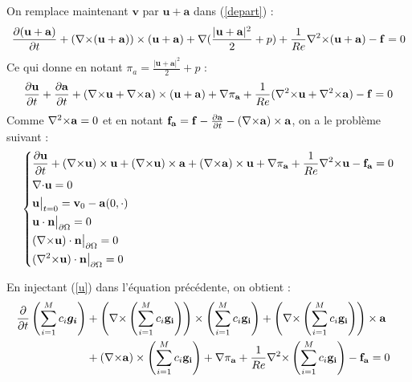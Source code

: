 On remplace maintenant $\mathbf{v}$ par $\mathbf{u}+\mathbf{a}$ dans (\ref{depart}) :
\[ \frac{\partial(\mathbf{u}+\mathbf{a})}{\partial t}+({\nabla\times}(\mathbf{u}+\mathbf{a}))\times(\mathbf{u}+\mathbf{a}) + {\nabla} (\frac{|\mathbf{u}+\mathbf{a}|^2}{2}+p) + \frac{1}{Re}{\nabla^2\times}(\mathbf{u}+\mathbf{a}) - \mathbf{f} = 0 \]
Ce qui donne en notant $\pi_a=\frac{|\mathbf{u}+\mathbf{a}|^2}{2}+p$ :
\[ \frac{\partial \mathbf{u}}{\partial t}+\frac{\partial \mathbf{a}}{\partial t} + ({\nabla\times} \mathbf{u}+{\nabla\times} \mathbf{a})\times(\mathbf{u}+\mathbf{a}) + {\nabla}\pi_{\mathbf{a}} + \frac{1}{Re}({\nabla^2\times} \mathbf{u}+{\nabla^2\times} \mathbf{a}) - \mathbf{f} = 0 \]
Comme ${\nabla^2\times} \mathbf{a} = 0$ et en notant $\mathbf{f_a}=\mathbf{f}-\frac{\partial \mathbf{a}}{\partial t} - ({\nabla\times} \mathbf{a})\times \mathbf{a}$, on a le problème suivant :
\begin{equation}\label{pbu}
\left\{\begin{aligned}
&\frac{\partial \mathbf{u}}{\partial t} + ({\nabla\times} \mathbf{u})\times \mathbf{u} + ({\nabla\times} \mathbf{u})\times \mathbf{a} +({\nabla\times} \mathbf{a})\times \mathbf{u} + {\nabla} \pi_{\mathbf{a}} +\frac{1}{Re}{\nabla^2\times}  \mathbf{u} - \mathbf{f_a} = 0\\
&{\nabla\cdot} \mathbf{u} = 0\\
&\mathbf{u}\big\rvert_{t=0} = \mathbf{v}_0 - \mathbf{a}(0,\cdot)\\
&\mathbf{u}\cdot \mathbf{n}{\big\rvert_{\partial\Omega}} = 0\\
&({\nabla\times} \mathbf{u})\cdot \mathbf{n}{\big\rvert_{\partial\Omega}} = 0\\
&({\nabla^2\times}  \mathbf{u})\cdot \mathbf{n}{\big\rvert_{\partial\Omega}} = 0
\end{aligned}\right.
\end{equation}

En injectant (\ref{u}) dans l'équation précédente, on obtient :
\begin{align*}
\frac{\partial}{\partial t}\left(\sum_{i=1}^M c_i\bm{g_i}\right) &+ \left({\nabla\times} \left(\sum_{i=1}^Mc_i\mathbf{g_i}\right)\right)\times \left(\sum_{i=1}^Mc_i\mathbf{g_i}\right) + \left({\nabla\times} \left(\sum_{i=1}^Mc_i\mathbf{g_i}\right)\right)\times \mathbf{a}&\\
&+ ({\nabla\times} \mathbf{a})\times \left(\sum_{i=1}^Mc_i\mathbf{g_i}\right) + {\nabla} \pi_{\mathbf{a}} +\frac{1}{Re}{\nabla^2\times}  \left(\sum_{i=1}^Mc_i\mathbf{g_i}\right) - \mathbf{f_a} =0\\
\end{align*} 

